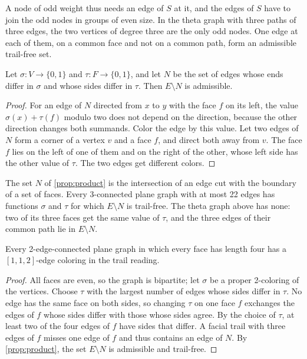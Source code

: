 \documentclass[11pt,a4paper]{article}
\begin{document}
A node of odd weight thus needs an edge of $S$ at it, and the edges of $S$ have to join the odd nodes in groups of even size.
In the theta graph with three paths of three edges, the two vertices of degree three are the only odd nodes.
One edge at each of them, on a common face and not on a common path, form an admissible trail-free set.

\begin{proposition}
\label{prop:product}
Let $\sigma\colon V\to\{0,1\}$ and $\tau\colon F\to\{0,1\}$, and let $N$ be the set of edges whose ends differ in $\sigma$ and whose sides differ in $\tau$.
Then $E\setminus N$ is admissible.
\end{proposition}

\begin{proof}
For an edge of $N$ directed from $x$ to $y$ with the face $f$ on its left, the value $\sigma(x)+\tau(f)$ modulo two does not depend on the direction, because the other direction changes both summands.
Color the edge by this value.
Let two edges of $N$ form a corner of a vertex $v$ and a face $f$, and direct both away from $v$.
The face $f$ lies on the left of one of them and on the right of the other, whose left side has the other value of $\tau$.
The two edges get different colors.
\end{proof}

The set $N$ of \cref{prop:product} is the intersection of an edge cut with the boundary of a set of faces.
Every 3-connected plane graph with at most 22 edges has functions $\sigma$ and $\tau$ for which $E\setminus N$ is trail-free.
The theta graph above has none: two of its three faces get the same value of $\tau$, and the three edges of their common path lie in $E\setminus N$.

\begin{corollary}
\label{cor:quadrangulation}
Every 2-edge-connected plane graph in which every face has length four has a $[1,1,2]$-edge coloring in the trail reading.
\end{corollary}

\begin{proof}
All faces are even, so the graph is bipartite; let $\sigma$ be a proper 2-coloring of the vertices.
Choose $\tau$ with the largest number of edges whose sides differ in $\tau$.
No edge has the same face on both sides, so changing $\tau$ on one face $f$ exchanges the edges of $f$ whose sides differ with those whose sides agree.
By the choice of $\tau$, at least two of the four edges of $f$ have sides that differ.
A facial trail with three edges of $f$ misses one edge of $f$ and thus contains an edge of $N$.
By \cref{prop:product}, the set $E\setminus N$ is admissible and trail-free.
\end{proof}
\end{document}
